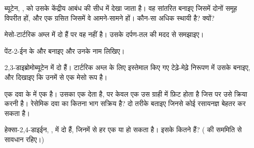 \begin{exercise}[$\star\star$]\label{exo:g12:stereochemistry:9}
ब्यूटेन, , को उसके केंद्रीय आबंध की सीध में देखा जाता है। वह
सांतरित  बनाइए जिसमें दोनों  समूह विपरीत हों, और
एक ग्रसित  जिसमें वे आमने-सामने हों। कौन-सा अधिक स्थायी है?
क्यों?
\end{exercise}

\begin{exercise}[$\star\star$]\label{exo:g12:stereochemistry:10}
मेसो-टार्टरिक अम्ल में दो  हैं पर वह  नहीं है।
उसके दर्पण-तल की मदद से समझाइए।
\end{exercise}

\begin{exercise}[$\star\star$]\label{exo:g12:stereochemistry:11}
पेंट-2-ईन के  और  बनाइए और उनके नाम लिखिए।
\end{exercise}

\begin{exercise}[$\star\star\star$]\label{exo:g12:stereochemistry:12}
2,3-डाइब्रोमोब्यूटेन  में दो  हैं।
टार्टरिक अम्ल के लिए इस्तेमाल किए गए टेढ़े-मेढ़े निरूपण में उसके 
बनाइए, और दिखाइए कि उनमें से एक मेसो रूप है।
\end{exercise}

\begin{exercise}[$\star\star\star$]\label{exo:g12:stereochemistry:13}
एक दवा के  में एक  है। उसका  एक  देता है, पर केवल एक  उस  ग्राही में फ़िट होता है जिस पर उसे
क्रिया करनी है। रेसेमिक दवा का कितना भाग सक्रिय है? दो तरीके बताइए जिनसे
कोई रसायनज्ञ बेहतर कर सकता है।
\end{exercise}

\begin{exercise}[$\star\star\star$]\label{exo:g12:stereochemistry:14}
हेक्सा-2,4-डाइईन, , में दो  हैं, जिनमें से हर एक
 या  हो सकता है। इसके कितने  हैं? ( की
सममिति से सावधान रहिए।)
\end{exercise}

